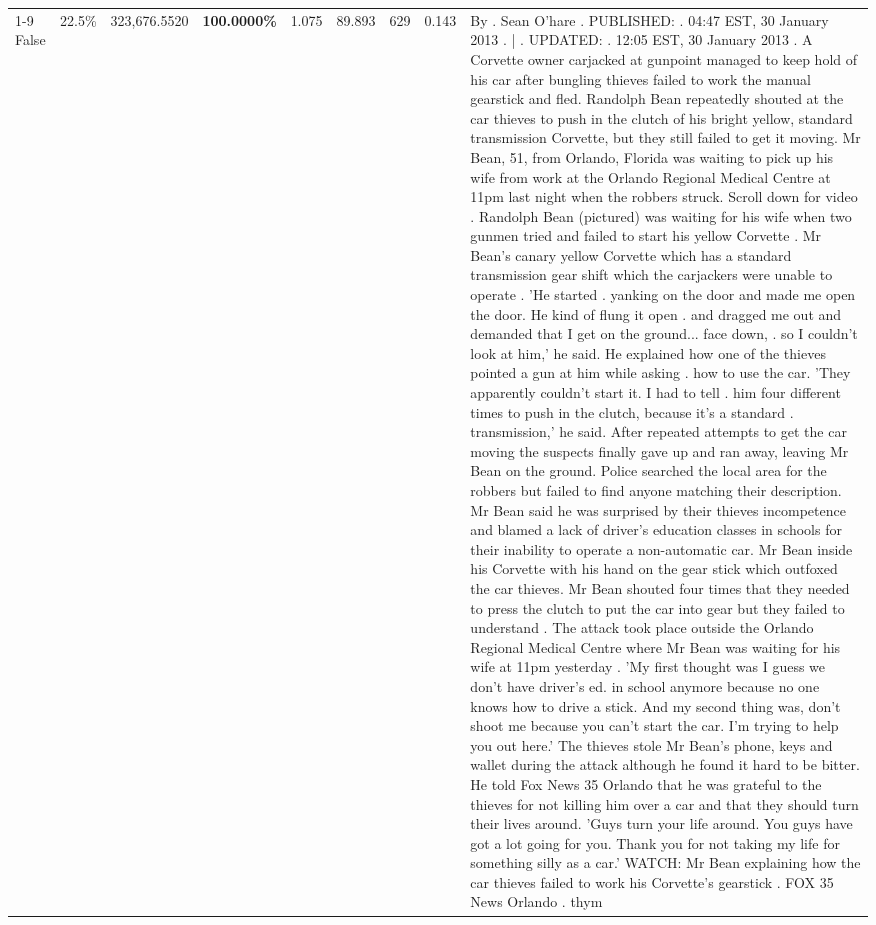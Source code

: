 \begin{table}[H]
\begin{tabular}{lllrlllll}
\cline{1-9} \cline{2-9}
False & 22.5\% & 323,676.5520 & \bfseries \color{red} 100.0000\% & 1.075 & 89.893 & 629 & 0.143 & By . Sean O'hare . PUBLISHED: . 04:47 EST, 30 January 2013 . | . UPDATED: . 12:05 EST, 30 January 2013 . A Corvette owner carjacked at gunpoint managed to keep hold of his car after bungling thieves failed to work the manual gearstick and fled. Randolph Bean repeatedly shouted at the car thieves to push in the clutch of his bright yellow, standard transmission Corvette, but they still failed to get it moving. Mr Bean, 51, from Orlando, Florida was waiting to pick up his wife from work at the Orlando Regional Medical Centre at 11pm last night when the robbers struck. Scroll down for video . Randolph Bean (pictured) was waiting for his wife when two gunmen tried and failed to start his yellow Corvette . Mr Bean's canary yellow Corvette which has a standard transmission gear shift which the carjackers were unable to operate . 'He started . yanking on the door and made me open the door. He kind of flung it open . and dragged me out and demanded that I get on the ground... face down, . so I couldn't look at him,' he said. He explained how one of the thieves pointed a gun at him while asking . how to use the car. 'They apparently couldn't start it. I had to tell . him four different times to push in the clutch, because it's a standard . transmission,' he said. After repeated attempts to get the car moving the suspects finally gave up and ran away, leaving Mr Bean on the ground. Police searched the local area for the robbers but failed to find anyone matching their description. Mr Bean said he was surprised by their thieves incompetence and blamed a lack of driver's education classes in schools for their inability to operate a non-automatic car. Mr Bean inside his Corvette with his hand on the gear stick which outfoxed the car thieves. Mr Bean shouted four times that they needed to press the clutch to put the car into gear but they failed to understand . The attack took place outside the Orlando Regional Medical Centre where Mr Bean was waiting for his wife at 11pm yesterday . 'My first thought was I guess we don't have driver's ed. in school anymore because no one knows how to drive a stick. And my second thing was, don't shoot me because you can't start the car. I'm trying to help you out here.' The thieves stole Mr Bean's phone, keys and wallet during the attack although he found it hard to be bitter. He told Fox News 35 Orlando that he was grateful to the thieves for not killing him over a car and that they should turn their lives around. 'Guys turn your life around. You guys have got a lot going for you. Thank you for not taking my life for something silly as a car.' WATCH: Mr Bean explaining how the car thieves failed to work his Corvette's gearstick . FOX 35 News Orlando . thym \\

\end{tabular}
\end{table}
